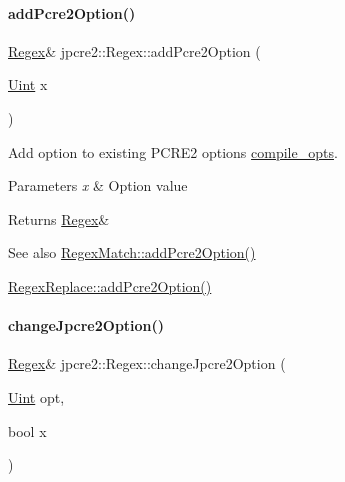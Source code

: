 \paragraph{\texorpdfstring{add\+Pcre2\+Option()}{addPcre2Option()}}
{\footnotesize\ttfamily \hyperlink{classjpcre2_1_1Regex}{Regex}\& jpcre2\+::\+Regex\+::add\+Pcre2\+Option (\begin{DoxyParamCaption}\item[{\hyperlink{namespacejpcre2_a078242d38221a13fb3543b9edd78c099}{Uint}}]{x }\end{DoxyParamCaption})\hspace{0.3cm}{\ttfamily [inline]}}



Add option to existing P\+C\+R\+E2 options \hyperlink{classjpcre2_1_1Regex_a5954131e9085de63229ed5c11417df69}{compile\+\_\+opts}. 


\begin{DoxyParams}{Parameters}
{\em x} & Option value \\
\hline
\end{DoxyParams}
\begin{DoxyReturn}{Returns}
\hyperlink{classjpcre2_1_1Regex}{Regex}\& 
\end{DoxyReturn}
\begin{DoxySeeAlso}{See also}
\hyperlink{classjpcre2_1_1RegexMatch_aac4857cd8f5eae15b29b9afbe9023522_aac4857cd8f5eae15b29b9afbe9023522}{Regex\+Match\+::add\+Pcre2\+Option()} 

\hyperlink{classjpcre2_1_1RegexReplace_a3cfd03568b23bebcbb530a2c120b5d33_a3cfd03568b23bebcbb530a2c120b5d33}{Regex\+Replace\+::add\+Pcre2\+Option()} 
\end{DoxySeeAlso}
\hypertarget{classjpcre2_1_1Regex_ab8e0b1a49eeb1077ba54cf3b5292c95e_ab8e0b1a49eeb1077ba54cf3b5292c95e}{}\label{classjpcre2_1_1Regex_ab8e0b1a49eeb1077ba54cf3b5292c95e_ab8e0b1a49eeb1077ba54cf3b5292c95e} 
\paragraph{\texorpdfstring{change\+Jpcre2\+Option()}{changeJpcre2Option()}}
{\footnotesize\ttfamily \hyperlink{classjpcre2_1_1Regex}{Regex}\& jpcre2\+::\+Regex\+::change\+Jpcre2\+Option (\begin{DoxyParamCaption}\item[{\hyperlink{namespacejpcre2_a078242d38221a13fb3543b9edd78c099}{Uint}}]{opt,  }\item[{bool}]{x }\end{DoxyParamCaption})\hspace{0.3cm}{\ttfamily [inline]}}



